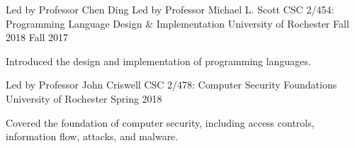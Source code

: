 

\begin{cventries}

  \cventryta
    {Led by Professor Chen Ding} %
    {Led by Professor Michael L. Scott} %
    {CSC 2/454: Programming Language Design \& Implementation} %
    {University of Rochester} %
    {Fall 2018} %
    {Fall 2017} %
    {
      \begin{cvitems} %
        \item {Introduced the design and implementation of programming languages. }
      \end{cvitems}
    }

  \cventry
    {Led by Professor John Criswell} %
    {CSC 2/478: Computer Security Foundations} %
    {University of Rochester} %
    {Spring 2018} %
    {
      \begin{cvitems} %
        \item {Covered the foundation of computer security, including access controls, information flow, attacks, and malware. }
      \end{cvitems}
    }
\end{cventries}
